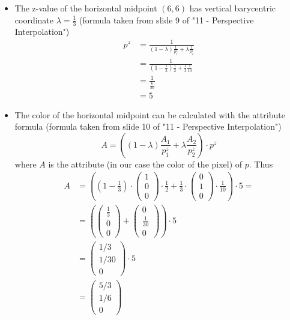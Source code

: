 \documentclass[a4paper, 11pt]{article}
\begin{document}
\begin{itemize}
	\item The z-value of the horizontal midpoint $(6, 6)$ has vertical
	      barycentric coordinate $\lambda = \frac{1}{3}$ (formula taken from slide
	      9 of "11 - Perspective Interpolation")
	      \begin{align*}
		      p^z & = \frac{1}{ (1-\lambda)  \frac{1}{p_1^z} + \lambda \frac{1}{p_2^z} } \\
		          & = \frac{1}{ (1- \frac{1}{3})  \frac{1}{2} + \frac{1}{3} \frac{1}{10}
		      }                                                                          \\
		          & = \frac{1}{ \frac{6}{30} }                                           \\
		          & = 5
	      \end{align*}

	\item The color of the horizontal midpoint can be calculated with the
	      attribute formula (formula taken from slide
	      10 of "11 - Perspective Interpolation")
	      $$ A = \left((1 - \lambda) \frac{A_1}{p_1^z} + \lambda \frac{A_2}{p_2^z}\right)
		      \cdot p^z $$
	      where $A$ is the attribute (in our case the color of the pixel) of $p$.
	      Thus
	      \begin{align*}
		      A & = \left(\left( 1 - \frac{1}{3} \right) \cdot
		      \begin{pmatrix} 1\\ 0\\ 0 \end{pmatrix}
		      \cdot \frac{1}{2} + \frac{1}{3} \cdot
		      \begin{pmatrix} 0\\ 1\\0 \end{pmatrix}
		      \cdot \frac{1}{10} \right) \cdot 5 =             \\
		        & = \left(
		      \begin{pmatrix} \frac{1}{3} \\ 0 \\ 0 \end{pmatrix}
		      +
		      \begin{pmatrix} 0 \\ \frac{1}{30} \\ 0 \end{pmatrix}
		      \right) \cdot 5                                  \\
		        & =
		      \begin{pmatrix} 1/3 \\ 1/30 \\ 0 \end{pmatrix}
		      \cdot 5                                          \\
		        & =
		      \begin{pmatrix} 5/3 \\ 1/6 \\ 0 \end{pmatrix}
	      \end{align*}

\end{itemize}
\end{document}
